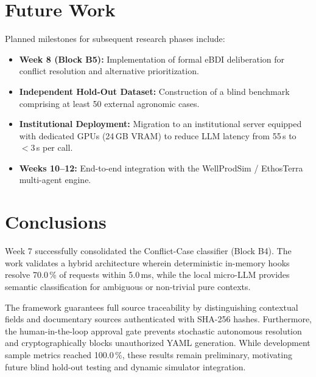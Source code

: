 \documentclass[11pt,a4paper]{article}
\begin{document}
\section{Future Work}
Planned milestones for subsequent research phases include:
\begin{itemize}[leftmargin=*]
    \item \textbf{Week 8 (Block B5):} Implementation of formal eBDI deliberation for conflict resolution and alternative prioritization.
    \item \textbf{Independent Hold-Out Dataset:} Construction of a blind benchmark comprising at least 50 external agronomic cases.
    \item \textbf{Institutional Deployment:} Migration to an institutional server equipped with dedicated GPUs (24\,GB VRAM) to reduce LLM latency from 55\,s to $<3$\,s per call.
    \item \textbf{Weeks 10--12:} End-to-end integration with the WellProdSim / EthosTerra multi-agent engine.
\end{itemize}

\section{Conclusions}
Week 7 successfully consolidated the Conflict-Case classifier (Block B4). The work validates a hybrid architecture wherein deterministic in-memory hooks resolve 70.0\,\% of requests within 5.0\,ms, while the local micro-LLM provides semantic classification for ambiguous or non-trivial pure contexts.

The framework guarantees full source traceability by distinguishing contextual fields and documentary sources authenticated with SHA-256 hashes. Furthermore, the human-in-the-loop approval gate prevents stochastic autonomous resolution and cryptographically blocks unauthorized YAML generation. While development sample metrics reached 100.0\,\%, these results remain preliminary, motivating future blind hold-out testing and dynamic simulator integration.

\end{document}
